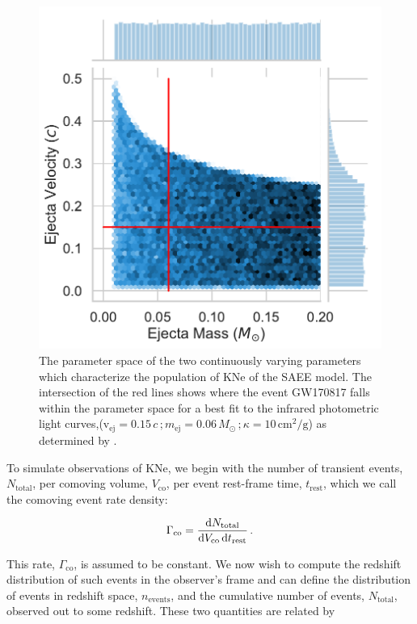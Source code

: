 \begin{figure}[t!]
  \centering
  \includegraphics[scale=0.58]{figures/rosswog_parameter_dist}
  \caption{The parameter space of the two continuously varying parameters which characterize the population of KNe of the SAEE model. The intersection of the red lines shows where the event GW170817 falls within the parameter space for a best fit to the infrared photometric light curves,($ \mathrm{v_{ej}} = 0.15\,c\,; m_{\mathrm{ej}} = 0.06 \, M_{\odot}\,; \kappa =10 \, \mathrm{cm^2 /g}$) as determined by \citet{Rosswog2018}.}\label{fig: ross_params}
\end{figure}

To simulate observations of KNe, we begin with the number of transient events, $N_{\mathrm{total}}$, per comoving volume, $V_{\mathrm{co}}$, per event rest-frame time, $t_{\mathrm{rest}}$, which we call the comoving event rate density:

\begin{equation}\label{eqn:erd}
   \Gamma_{\mathrm{co}} =\frac{\mathrm{d} N_{\mathrm{total}}}{\mathrm{d} V_{\mathrm{co}}\, \mathrm{d} t_{\mathrm{rest}}}\,.
\end{equation}

This rate, $\Gamma_{\mathrm{co}}$, is assumed to be constant. We now wish to compute the redshift distribution of such events in the observer's frame and can define the distribution of events in redshift space, $n_{\mathrm{events}}$, and the cumulative number of events, $N_{\mathrm{total}}$, observed out to some redshift. These two quantities are related by

